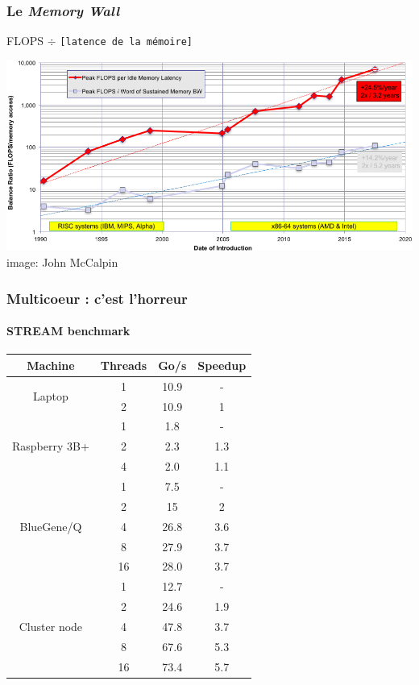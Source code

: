 \documentclass[xcolor={x11names,svgnames}]{beamer}
\begin{document}
\begin{frame}
  \frametitle{Le \og \emph{Memory Wall}\fg{}}

  \begin{center}
    \large FLOPS $\div$ \texttt{[latence de la mémoire]}
  \end{center}

  \bigskip

  \includegraphics[width=\textwidth]{calpin_wall_latence.png}
    \flushright image: John McCalpin
\end{frame}


\begin{frame}
  \frametitle{Multicoeur : c'est l'horreur}
  \framesubtitle{STREAM benchmark}
  
  \smallskip
  
  \small
  \centering
\begin{tabular}{|cc|c|c|}
  \hline
  Machine         & Threads & Go/s & Speedup \\
    \hline  \hline
  \multirow{2}{*}{Laptop}          & 1 & 10.9  & -\\
            & 2 & 10.9  & \alert{1} \\
  \hline
  \multirow{3}{*}{Raspberry 3B+}       & 1  & 1.8  & - \\
         & 2  & 2.3  & \alert{1.3} \\
         & 4  & 2.0  & \alert{1.1} \\
  \hline
  \multirow{5}{*}{BlueGene/Q}      & 1  & 7.5  & -\\ 
        & 2  & 15   & 2\\
        & 4  & 26.8 & 3.6 \\
        & 8  & 27.9 & \alert{3.7} \\
        & 16 & 28.0 & \alert{3.7} \\ 
  \hline
  \multirow{5}{*}{Cluster node}    & 1  & 12.7 & - \\
      & 2  & 24.6 & 1.9 \\
      & 4  & 47.8 & 3.7 \\
      & 8  & 67.6 & {\color{orange} 5.3} \\
      & 16 & 73.4 & \alert{5.7} \\
  \hline
\end{tabular}
\end{frame}
\end{document}
